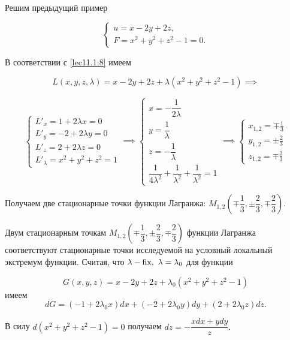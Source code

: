 \documentclass[../../main.tex]{subfiles}
\begin{document}
	\begin{exmp}
	
	Решим предыдущий пример 
	
	\[\begin{cases}
	u = x - 2y + 2z, \\
	F = x^2 + y^2 + z^2 - 1 = 0.
    \end{cases}\]
	
	В соответствии с \eqref{lec11.1:8} имеем 
	
	\[L \left( x, y, z, \lambda \right) = x - 2y + 2z + \lambda \left( x^2 + y^2 
	+ z^2 - 1 \right) \implies\]
	
	\[
	\begin{cases}
	L'_x = 1 + 2 \lambda x = 0 \\
	L'_y = -2 + 2 \lambda y = 0 \\
	L'_z = 2 + 2 \lambda z = 0 \\
	L'_\lambda = x^2 + y^2 + z^2 = 1
	\end{cases} \implies
	\begin{cases}
	x = -\dfrac{1}{2\lambda} \\
	y = \dfrac{1}{\lambda} \\
	z = -\dfrac{1}{\lambda} \\
	\dfrac{1}{4\lambda^2} + \dfrac{1}{\lambda^2} + \dfrac{1}{\lambda^2} = 1
	\end{cases} \implies
	\begin{cases}
	x_{1, 2} = \mp \frac{1}{3} \\
	y_{1, 2} = \pm \frac{2}{3} \\
	z_{1, 2} = \mp \frac{2}{3} 
	\end{cases}
	\]
	
	Получаем две стационарные точки функции Лагранжа: $M_{1, 2} 
	\left( \mp \dfrac{1}{3}, 
	\pm \dfrac{2}{3}, \mp \dfrac{2}{3} \right)$.
	
	Двум стационарным точкам $M_{1, 2} \left( \mp \dfrac{1}{3}, 
	\pm \dfrac{2}{3}, \mp \dfrac{2}{3} \right)$ функции Лагранжа 
	соответствуют стационарные точки исследуемой на условный 
	локальный экстремум функции. Считая, что $\lambda - \operatorname{fix},\  
	\lambda = \lambda_0$ для функции
	
	\[G\left( x, y, z \right) = x - 2y + 2z + 
	\lambda_0\left( x^2 + y^2 + z^2 - 1 \right)\]
	имеем
	\[
	dG = \left( -1 + 2 \lambda_0 x \right)dx + \left( -2 + 2\lambda_0 y\right)dy 
	+ \left( 2 + 2 \lambda_0 z\right) dz.\]
	
	В силу $d\left( x^2 + y^2 + z^2 - 1 
	\right) = 0$ получаем
	$dz = - \dfrac{xdx + ydy}{z}.$
	

\end{exmp}
\end{document}
